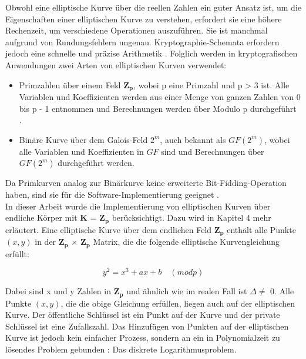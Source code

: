 Obwohl eine elliptische Kurve über die reellen Zahlen ein guter Ansatz ist, um die Eigenschaften einer elliptischen Kurve zu verstehen, erfordert sie eine höhere Rechenzeit, um verschiedene Operationen auszuführen. Sie ist manchmal aufgrund von Rundungsfehlern ungenau. Kryptographie-Schemata erfordern jedoch eine schnelle und präzise Arithmetik \cite{razad}. Folglich werden in kryptografischen Anwendungen zwei Arten von elliptischen Kurven verwendet:
	\begin{itemize}
	    \item Primzahlen über einem Feld $ \mathbf{Z_p} $, wobei p eine Primzahl und p > 3 ist. Alle Variablen und Koeffizienten werden aus einer Menge von ganzen Zahlen von 0 bis p - 1 entnommen und Berechnungen werden über Modulo p durchgeführt \cite{werner}.
        \item 	Binäre Kurve über dem Galois-Feld $ 2^m $, auch bekannt als $ GF(2^m) $, wobei alle Variablen und Koeffizienten in $ GF $ sind und Berechnungen über $ GF(2^m) $ durchgeführt werden.
	\end{itemize}

Da Primkurven analog zur Binärkurve keine erweiterte Bit-Fidding-Operation haben, sind sie für die Software-Implementierung geeignet \cite{razad}.\\



In dieser Arbeit wurde die Implementierung von elliptischen Kurven über endliche Körper mit $ \mathbf{K} $ = $ \mathbf{Z_p} $ berücksichtigt. Dazu wird in Kapitel 4 mehr erläutert.
Eine elliptische Kurve über dem endlichen Feld $ \mathbf{Z_p} $ enthält alle Punkte $ (x, y) $ in der $ \mathbf{Z_p} $ $ \times $ $ \mathbf{Z_p} $ Matrix, die die folgende elliptische Kurvengleichung erfüllt: 

\begin{ceqn}

\begin{equation}
     y^2 = x^3 + ax + b  \quad (mod p)
     \label{curve}
\end{equation}

\end{ceqn}

Dabei sind x und y Zahlen in $ \mathbf{Z_p} $  und ähnlich wie im realen Fall ist $ \Delta \neq $ 0.
Alle Punkte $ (x, y) $, die die obige Gleichung  erfüllen, liegen auch auf der elliptischen Kurve. Der öffentliche Schlüssel ist ein Punkt auf der Kurve und der private Schlüssel ist eine Zufallszahl. Das Hinzufügen von Punkten auf der elliptischen Kurve ist jedoch kein einfacher Prozess, sondern an ein in Polynomialzeit zu lösendes Problem gebunden \cite{mo2014}: Das diskrete Logarithmusproblem. 


